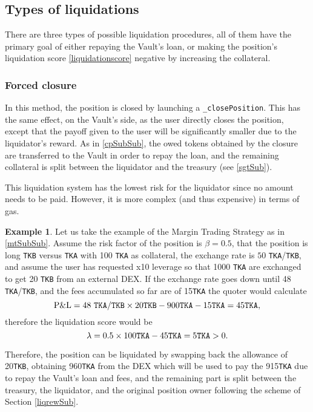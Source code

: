 \documentclass[a4paper,10 pt]{article}
\theoremstyle{definition}
\newtheorem{example}{Example}
\begin{document}
\subsection{Types of liquidations}\label{tolSub}
There are three types of possible liquidation procedures, all of them have the primary goal of either repaying the Vault's loan, or making the position's liquidation score \eqref{liquidationscore} negative by increasing the collateral.

\subsubsection{Forced closure}\label{fcSubSub}
In this method, the position is closed by launching a \verb|_closePosition|. This has the same effect, on the Vault's side, as the user directly closes the position, except that the payoff given to the user will be significantly smaller due to the liquidator's reward. As in \ref{cpSubSub}, the owed tokens obtained by the closure are transferred to the Vault in order to repay the loan, and the remaining collateral is split between the liquidator and the treasury (see \ref{sgtSub}).

This liquidation system has the lowest risk for the liquidator since no amount needs to be paid. However, it is more complex (and thus expensive) in terms of gas.

\begin{example}\label{mtLiqEx1}
Let us take the example of the Margin Trading Strategy as in \ref{mtSubSub}. Assume the risk factor of the position is $\beta = 0.5$, that the position is long \verb|TKB| versus \verb|TKA| with 100 \verb|TKA| as collateral, the exchange rate is $50$ \verb|TKA|/\verb|TKB|, and assume the user has requested x10 leverage so that 1000 \verb|TKA| are exchanged to get 20 \verb|TKB| from an external DEX. If the exchange rate goes down until 48 \verb|TKA|/\verb|TKB|, and the fees accumulated so far are of 15\verb|TKA| the quoter would calculate $$\text{P\&L} =  48\ \verb|TKA|/\verb|TKB| \times 20  \verb|TKB| -  900 \verb|TKA| - 15\verb|TKA|= 45  \verb|TKA|,$$ therefore the liquidation score would be $$\lambda = 0.5 \times 100\verb|TKA| - 45 \verb|TKA| = 5  \verb|TKA| > 0.$$ 

Therefore, the position can be liquidated by swapping back the allowance of 20\verb|TKB|, obtaining 960\verb|TKA| from the DEX which will be used to pay the 915\verb|TKA| due to repay the Vault's loan and fees, and the remaining part is split between the treasury, the liquidator, and the original position owner following the scheme of Section \ref{liqrewSub}.
\end{example}
\end{document}
